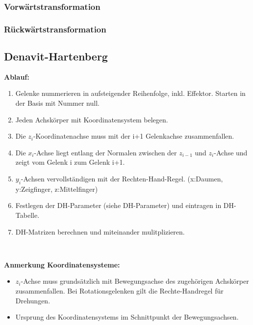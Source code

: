 \subsubsection{Vorwärtstransformation }
\subsubsection{Rückwärtstransformation }
\clearpage
\subsection{Denavit-Hartenberg }
\begin{minipage}{19cm}
    \textbf{Ablauf:}
    \begin{enumerate}{\setlength{\itemsep}{0cm}\setlength{\parsep}{0cm} \setlength{\topsep}{0cm}}
        \item Gelenke nummerieren in aufsteigender Reihenfolge, inkl. Effektor. Starten in der Basis mit Nummer null.
        \item Jeden Achskörper mit Koordinatensystem belegen.
        \item Die $z_i$-Koordinatenachse muss mit der i+1 Gelenkachse zusammenfallen.
        \item Die $x_i$-Achse liegt entlang der Normalen zwischen der $z_{i-1}$ und $z_i$-Achse und zeigt vom Gelenk i zum Gelenk i+1.
        \item $y_i$-Achsen vervollständigen mit der Rechten-Hand-Regel. (x:Daumen, y:Zeigfinger, z:Mittelfinger)
        \item Festlegen der DH-Parameter (siehe DH-Parameter) und eintragen in DH-Tabelle.
        \item DH-Matrizen berechnen und miteinander mulitplizieren.
    \end{enumerate}
    \vspace{0.2cm}
\end{minipage}\\

\begin{minipage}{19cm}
    \textbf{Anmerkung Koordinatensysteme:}
    \begin{itemize}\itemsep0pt
        \item $z_i$-Achse muss grundsätzlich mit Bewegungsachse des zugehörigen Achskörper zusammenfallen.
        Bei Rotationsgelenken gilt die Rechte-Handregel für Drehungen. 
        \item Ursprung des Koordinatensystems im Schnittpunkt der Bewegungsachsen.
    \end{itemize}
    \vspace{0.2cm}
\end{minipage}\\

